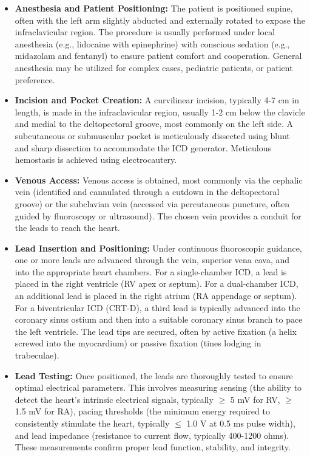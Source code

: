 \begin{itemize}
  \item \textbf{Anesthesia and Patient Positioning:} The patient is positioned supine, often with the left arm slightly abducted and externally rotated to expose the infraclavicular region. The procedure is usually performed under local anesthesia (e.g., lidocaine with epinephrine) with conscious sedation (e.g., midazolam and fentanyl) to ensure patient comfort and cooperation. General anesthesia may be utilized for complex cases, pediatric patients, or patient preference.
  
  \item \textbf{Incision and Pocket Creation:} A curvilinear incision, typically 4-7 cm in length, is made in the infraclavicular region, usually 1-2 cm below the clavicle and medial to the deltopectoral groove, most commonly on the left side. A subcutaneous or submuscular pocket is meticulously dissected using blunt and sharp dissection to accommodate the ICD generator. Meticulous hemostasis is achieved using electrocautery.
  
  \item \textbf{Venous Access:} Venous access is obtained, most commonly via the cephalic vein (identified and cannulated through a cutdown in the deltopectoral groove) or the subclavian vein (accessed via percutaneous puncture, often guided by fluoroscopy or ultrasound). The chosen vein provides a conduit for the leads to reach the heart.
  
  \item \textbf{Lead Insertion and Positioning:} Under continuous fluoroscopic guidance, one or more leads are advanced through the vein, superior vena cava, and into the appropriate heart chambers. For a single-chamber ICD, a lead is placed in the right ventricle (RV apex or septum). For a dual-chamber ICD, an additional lead is placed in the right atrium (RA appendage or septum). For a biventricular ICD (CRT-D), a third lead is typically advanced into the coronary sinus ostium and then into a suitable coronary sinus branch to pace the left ventricle. The lead tips are secured, often by active fixation (a helix screwed into the myocardium) or passive fixation (tines lodging in trabeculae).
  
  \item \textbf{Lead Testing:} Once positioned, the leads are thoroughly tested to ensure optimal electrical parameters. This involves measuring sensing (the ability to detect the heart's intrinsic electrical signals, typically $\geq$ 5 mV for RV, $\geq$ 1.5 mV for RA), pacing thresholds (the minimum energy required to consistently stimulate the heart, typically $\leq$ 1.0 V at 0.5 ms pulse width), and lead impedance (resistance to current flow, typically 400-1200 ohms). These measurements confirm proper lead function, stability, and integrity.
  

\end{itemize}
